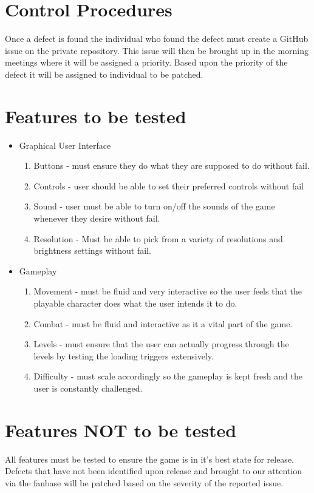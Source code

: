 \documentclass[a4paper, 10pt]{article}
\begin{document}
\section{Control Procedures}
Once a defect is found the individual who found the defect must create a GitHub issue on the private repository. This issue will then be brought up in the morning meetings where it will be assigned a priority. Based upon the priority of the defect it will be assigned to individual to be patched.

\section{Features to be tested}
    \begin{itemize}
        \item Graphical User Interface
        \begin{enumerate}
            \item Buttons - must ensure they do what they are supposed to do without fail.
            \item Controls - user should be able to set their preferred controls without fail
            \item Sound - user must be able to turn on/off the sounds of the game whenever they desire without fail.
            \item Resolution - Must be able to pick from a variety of resolutions and brightness settings without fail.
        \end{enumerate}
        \item Gameplay
        \begin{enumerate}
            \item Movement - must be fluid and very interactive so the user feels that the playable character does what the user intends it to do.
            \item Combat - must be fluid and interactive as it a vital part of the game.
            \item Levels - must ensure that the user can actually progress through the levels by testing the loading triggers extensively.
            \item Difficulty - must scale accordingly so the gameplay is kept fresh and the user is constantly challenged.
        \end{enumerate}
    \end{itemize}
    
\section{Features NOT to be tested}
All features must be tested to ensure the game is in it's best state for release. Defects that have not been identified upon release and brought to our attention via the fanbase will be patched based on the severity of the reported issue.
\end{document}
